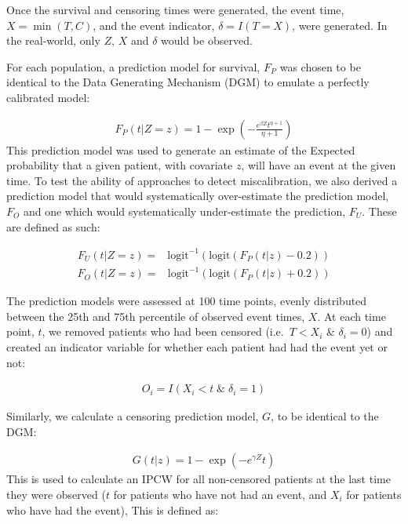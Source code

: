 \documentclass[12pt,PhD,twoside,openright]{muthesis}
\newcommand{\txt}[1]{\textrm{#1}}
\def\logit{\txt{logit}}
\begin{document}
Once the survival and censoring times were generated, the event time, \(X = \min(T,C)\), and the event indicator, \(\delta = I(T=X)\), were generated. In the real-world, only \(Z\), \(X\) and \(\delta\) would be observed.

For each population, a prediction model for survival, \(F_P\) was chosen to be identical to the Data Generating Mechanism (DGM) to emulate a perfectly calibrated model:

\[
\begin{array}{c}
F_P(t|Z = z) = 1 - \exp\left(-\frac{e^{\beta Z}t^{\eta+1}}{\eta+1}\right)
\end{array}
\]
This prediction model was used to generate an estimate of the Expected probability that a given patient, with covariate \(z\), will have an event at the given time. To test the ability of approaches to detect miscalibration, we also derived a prediction model that would systematically over-estimate the prediction model, \(F_O\) and one which would systematically under-estimate the prediction, \(F_U\). These are defined as such:

\[
\begin{array}{rl}
F_U(t|Z=z) =& \logit^{-1}\left(\logit\left( F_P(t|z) - 0.2\right)\right)
\end{array}
\]
\[
\begin{array}{rl}
F_O(t|Z=z) =& \logit^{-1}\left(\logit\left( F_P(t|z) + 0.2\right)\right)
\end{array}
\]

The prediction models were assessed at 100 time points, evenly distributed between the 25th and 75th percentile of observed event times, \(X\). At each time point, \(t\), we removed patients who had been censored (i.e.~\(T < X_i\) \& \(\delta_i = 0\))
and created an indicator variable for whether each patient had had the event yet or not:

\[
\begin{array}{c}
O_i = I(X_i < t\;\&\; \delta_i = 1)
\end{array}
\]

Similarly, we calculate a censoring prediction model, \(G\), to be identical to the DGM:

\[
\begin{array}{c}
G(t|z) = 1-\exp\left(-e^{\gamma Z}t\right)
\end{array}
\]
This is used to calculate an IPCW for all non-censored patients at the last time they were observed (\(t\) for patients who have not had an event, and \(X_i\) for patients who have had the event), This is defined as:
\end{document}
